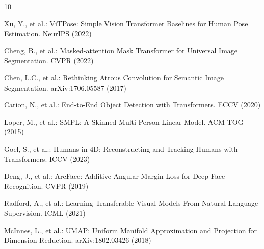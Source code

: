 \documentclass[runningheads]{llncs}
\begin{document}

\begin{thebibliography}{10}

Xu, Y., et al.: ViTPose: Simple Vision Transformer Baselines for Human Pose Estimation. NeurIPS (2022)

Cheng, B., et al.: Masked-attention Mask Transformer for Universal Image Segmentation. CVPR (2022)

Chen, L.C., et al.: Rethinking Atrous Convolution for Semantic Image Segmentation. arXiv:1706.05587 (2017)

Carion, N., et al.: End-to-End Object Detection with Transformers. ECCV (2020)

Loper, M., et al.: SMPL: A Skinned Multi-Person Linear Model. ACM TOG (2015)

Goel, S., et al.: Humans in 4D: Reconstructing and Tracking Humans with Transformers. ICCV (2023)

Deng, J., et al.: ArcFace: Additive Angular Margin Loss for Deep Face Recognition. CVPR (2019)

Radford, A., et al.: Learning Transferable Visual Models From Natural Language Supervision. ICML (2021)

McInnes, L., et al.: UMAP: Uniform Manifold Approximation and Projection for Dimension Reduction. arXiv:1802.03426 (2018)

\end{thebibliography}
\end{document}
